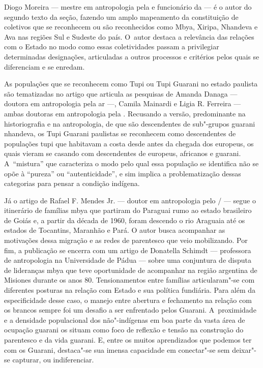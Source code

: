 Diogo Moreira --- mestre em antropologia pela  e funcionário da 
--- é o autor do segundo texto da seção, fazendo um amplo mapeamento da
constituição de coletivos que se reconhecem ou são reconhecidos como
Mbya, Xiripa, Nhandeva e Ava nas regiões Sul e Sudeste do país. O~autor
destaca a relevância das relações com o Estado no modo como essas
coletividades passam a privilegiar determinadas designações,
articuladas a outros processos e critérios pelos quais se diferenciam e
se enredam. 

As populações que se reconhecem como Tupi ou Tupi Guarani no estado
paulista são tematizadas no artigo que articula as pesquisas de Amanda
Danaga --- doutora em antropologia pela ar ---, Camila Mainardi e Ligia
R. Ferreira --- ambas doutoras em antropologia pela . Recusando a
versão, predominante na historiografia e na antropologia, de que são
descendentes de sub"-grupos guarani nhandeva, os Tupi Guarani paulistas
se reconhecem como descendentes de populações tupi que habitavam a
costa desde antes da chegada dos europeus, os quais vieram se casando
com descendentes de europeus, africanos e guarani. A~``mistura'' que
caracteriza o modo pelo qual essa população se identifica não se opõe à
``pureza'' ou ``autenticidade'', e sim implica a problematização dessas
categorias para pensar a condição indígena. 

Já o artigo de Rafael F. Mendes Jr. --- doutor em antropologia pelo
/ --- segue o itinerário de famílias mbya que partiram do Paraguai
rumo ao estado brasileiro de Goiás e, a partir da década de 1960, foram
descendo o rio Araguaia até os estados de Tocantins, Maranhão e Pará. O
autor busca acompanhar as motivações dessa migração e as redes de
parentesco que veio mobilizando. Por fim, a publicação se encerra com
um artigo de Donatella Schimdt --- professora de antropologia na
Universidade de Pádua --- sobre uma conjuntura de disputa de lideranças
mbya que teve oportunidade de acompanhar na região argentina de
Misiones durante os anos 80. Tensionamentos entre famílias
articularam"-se com diferentes posturas na relação com Estado e sua
política fundiária. Para além da especificidade desse caso, o manejo
entre abertura e fechamento na relação com os brancos sempre foi um
desafio a ser enfrentado pelos Guarani. A~proximidade e a densidade
populacional dos não"-indígenas em boa parte da vasta área de ocupação
guarani os situam como foco de reflexão e tensão na construção do
parentesco e da vida guarani. E, entre os muitos aprendizados que
podemos ter com os Guarani, destaca"-se sua imensa capacidade em
conectar"-se sem deixar"-se capturar, ou indiferenciar.

